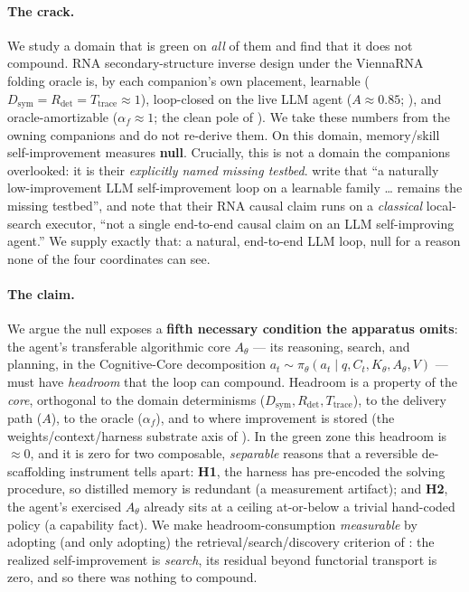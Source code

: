 \documentclass[11pt]{article}
\newcommand{\Dsym}{D_{\mathrm{sym}}}
\newcommand{\Rdet}{R_{\mathrm{det}}}
\newcommand{\Ttrace}{T_{\mathrm{trace}}}
\newcommand{\Ath}{A_{\theta}}
\newcommand{\af}{\alpha_f}
\begin{document}
\paragraph{The crack.} We study a domain that is green on \emph{all} of them and find that it does not
compound. RNA secondary-structure inverse design under the ViennaRNA folding oracle is, by each
companion's own placement, learnable ($\Dsym\!=\!\Rdet\!=\!\Ttrace\!\approx\!1$), loop-closed on the
live LLM agent ($A\!\approx\!0.85$; \citealp{actuation}), and oracle-amortizable ($\af\!\approx\!1$; the
clean pole of \citealp{oracleresidue}). We take these numbers from the owning companions and do not
re-derive them. On this domain, memory/skill self-improvement measures \textbf{null}. Crucially, this
is not a domain the companions overlooked: it is their \emph{explicitly named missing testbed}.
\citet{determinismmanifold} write that ``a naturally low-improvement LLM self-improvement loop on a
learnable family \dots{} remains the missing testbed'', and \citet{actuation} note that their RNA causal
claim runs on a \emph{classical} local-search executor, ``not a single end-to-end causal claim on an LLM
self-improving agent.'' We supply exactly that: a natural, end-to-end LLM loop, null for a reason none
of the four coordinates can see.

\paragraph{The claim.} We argue the null exposes a \textbf{fifth necessary condition the apparatus
omits}: the agent's transferable algorithmic core $\Ath$ --- its reasoning, search, and planning, in the
Cognitive-Core decomposition $a_t\sim\pi_\theta(a_t\mid q,C_t,K_\theta,\Ath,V)$ --- must have
\emph{headroom} that the loop can compound. Headroom is a property of the \emph{core}, orthogonal to the
domain determinisms ($\Dsym,\Rdet,\Ttrace$), to the delivery path ($A$), to the oracle ($\af$), and to
where improvement is stored (the weights/context/harness substrate axis of
\citealp{determinismmanifold}). In the green zone this headroom is $\approx\!0$, and it is zero for two
composable, \emph{separable} reasons that a reversible de-scaffolding instrument tells apart:
\textbf{H1}, the harness has pre-encoded the solving procedure, so distilled memory is redundant (a
measurement artifact); and \textbf{H2}, the agent's exercised $\Ath$ already sits at a ceiling
at-or-below a trivial hand-coded policy (a capability fact). We make headroom-consumption
\emph{measurable} by adopting (and only adopting) the retrieval/search/discovery criterion of
\citet{wangbuehler2026}: the realized self-improvement is \emph{search}, its residual beyond functorial
transport is zero, and so there was nothing to compound.
\end{document}
